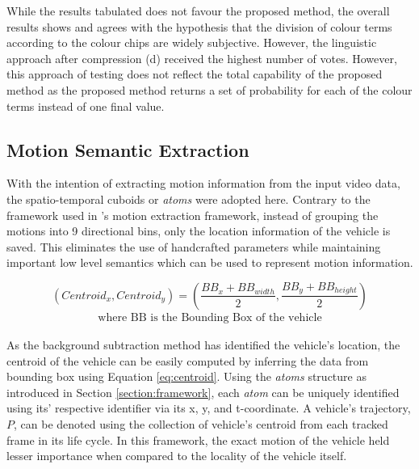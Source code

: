 \vspace{-2em}

While the results tabulated does not favour the proposed method, the overall results shows and agrees with the hypothesis that the division of colour terms according to the colour chips are widely subjective. However, the linguistic approach after compression (d) received the highest number of votes.
However, this approach of testing does not reflect the total capability of the proposed method as the proposed method returns a set of probability for each of the colour terms instead of one final value.



\subsection{Motion Semantic Extraction}
\label{subsec:chamferdistancemotionextraction}

With the intention of extracting motion information from the input video data, the spatio-temporal cuboids or \emph{atoms} were adopted here. Contrary to the framework used in \versionOneExt's motion extraction framework, instead of grouping the motions into 9 directional bins, only the location information of the vehicle is saved. This eliminates the use of handcrafted parameters while maintaining important low level semantics which can be used to represent motion information.


\begin{equation}
\label{eq:centroid}
(Centroid_x, Centroid_y) = (\frac{BB_{x}+BB_{width}}{2} , \frac{BB_{y}+BB_{height}}{2})
\end{equation}
\vspace{-2em}
\begin{align*}
    \text{where BB is the Bounding Box of the vehicle}
\end{align*}

As the background subtraction method has identified the vehicle's location, the centroid of the vehicle can be easily computed by inferring the data from bounding box using Equation \ref{eq:centroid}. Using the \emph{atoms} structure as introduced in Section \ref{section:framework}, each \emph{atom} can be uniquely identified using its' respective identifier via its x, y, and t-coordinate. A vehicle's trajectory, $P$, can be denoted using the collection of  vehicle's centroid from each tracked frame in its life cycle. In this framework, the exact motion of the vehicle held lesser importance when compared to the locality of the vehicle itself.

